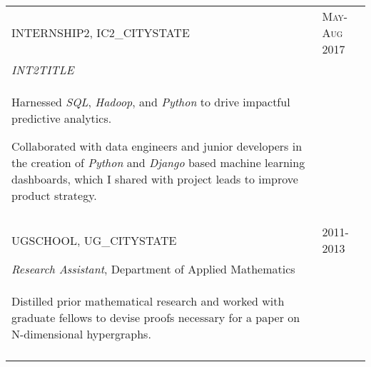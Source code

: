 \documentclass[a4paper,10pt]{article}
\begin{document}
\begin{supertabular}{p{13.9cm}>{\raggedleft\arraybackslash}p{3.4cm}}
	\textsc{INTERNSHIP2}, IC2_CITYSTATE
	& \textsc{May-Aug 2017} \\
	\small	\emph{INT2TITLE} & \\
	\begin{enumerate*}[label =$\circ$, itemjoin={\newline}]
		\item \footnotesize Harnessed \emph{SQL}, \emph{Hadoop}, and \emph{Python} to drive impactful predictive analytics.
		\item \footnotesize Collaborated with data engineers and junior developers in the creation of \emph{Python} and \emph{Django} based machine learning dashboards, which I shared with project leads to improve product strategy.
	\end{enumerate*} & \\
	 \\



	\textsc{UGSCHOOL}, UG_CITYSTATE
	& \textsc{2011-2013} \\
	\small	\emph{Research Assistant}, Department of Applied Mathematics & \\
	\begin{enumerate*}[label =$\circ$, itemjoin={\newline}]
		\item \footnotesize Distilled prior mathematical research and worked with graduate fellows to devise proofs necessary for a paper on N-dimensional hypergraphs.
	\end{enumerate*} & \\
	 \\


\end{supertabular}







\end{document}
